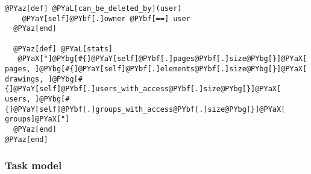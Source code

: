 \begin{Verbatim}[commandchars=@\[\]]
  @PYaz[def] @PYaL[can_be_deleted_by](user)
    @PYaY[self]@PYbf[.]owner @PYbf[==] user
  @PYaz[end]
  
  @PYaz[def] @PYaL[stats]
   @PYaX["]@PYbg[#{]@PYaY[self]@PYbf[.]pages@PYbf[.]size@PYbg[}]@PYaX[ pages, ]@PYbg[#{]@PYaY[self]@PYbf[.]elements@PYbf[.]size@PYbg[}]@PYaX[ drawings, ]@PYbg[#{]@PYaY[self]@PYbf[.]users_with_access@PYbf[.]size@PYbg[}]@PYaX[ users, ]@PYbg[#{]@PYaY[self]@PYbf[.]groups_with_access@PYbf[.]size@PYbg[}]@PYaX[ groups]@PYaX["] 
  @PYaz[end]
@PYaz[end]
\end{Verbatim}


\subsubsection{Task model} %
\label{ssub:page_model}

